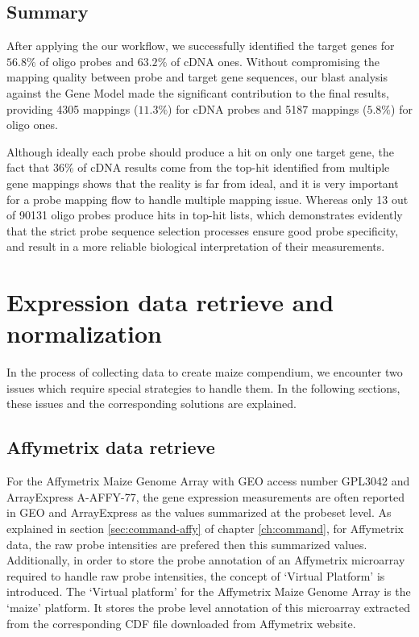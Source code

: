 \subsection*{Summary}

After applying the our workflow, we successfully identified the target genes 
for $56.8\%$ of oligo probes and $63.2\%$ of cDNA ones. 
Without compromising the mapping quality between probe and target gene 
sequences, our blast analysis against the Gene Model made the significant 
contribution to the final results, providing 4305 mappings ($11.3\%$) for cDNA 
probes and 5187 mappings ($5.8\%$) for oligo ones.

Although ideally each probe should produce a hit on only one target 
gene, the fact that $36\%$ of cDNA results come from the top-hit identified 
from multiple gene mappings shows that the reality is far from ideal, and it is 
very important for a probe mapping flow to handle multiple mapping issue. 
Whereas only 13 out of 90131 oligo probes produce hits in top-hit lists, which 
demonstrates evidently that the strict probe sequence selection processes 
ensure good probe specificity, and result in a more reliable biological 
interpretation of their measurements.










\section{Expression data retrieve and normalization}\label{apd:magic-datanorm}

In the process of collecting data to create maize compendium, we encounter two 
issues which require special strategies to handle them. 
In the following sections, these issues and the corresponding solutions are 
explained.

\subsection{Affymetrix data retrieve}

For the Affymetrix Maize Genome Array with GEO access number GPL3042
and ArrayExpress A-AFFY-77, the gene expression measurements are often
reported in GEO and ArrayExpress as the values summarized at the
probeset level.
%
As explained in section \ref{sec:command-affy} of chapter
\ref{ch:command}, for Affymetrix data, the raw probe intensities are
prefered then this summarized values.
%
Additionally, in order to store the probe annotation of an Affymetrix
microarray required to handle raw probe intensities, the concept of
`Virtual Platform' is introduced.
%
The `Virtual platform' for the Affymetrix Maize Genome Array is the
`maize' platform.  It stores the probe level annotation of this
microarray extracted from the corresponding CDF file downloaded from
Affymetrix website.


